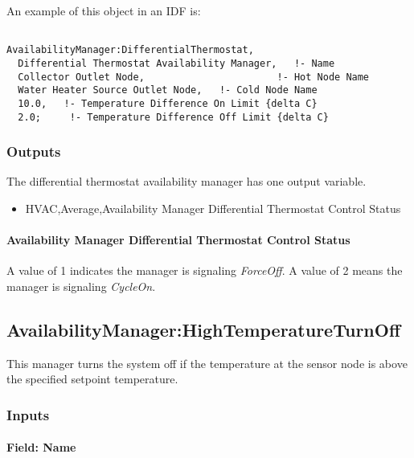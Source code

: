An example of this object in an IDF is:

\begin{lstlisting}

AvailabilityManager:DifferentialThermostat,
  Differential Thermostat Availability Manager,   !- Name
  Collector Outlet Node,                       !- Hot Node Name
  Water Heater Source Outlet Node,   !- Cold Node Name
  10.0,   !- Temperature Difference On Limit {delta C}
  2.0;     !- Temperature Difference Off Limit {delta C}
\end{lstlisting}

\subsubsection{Outputs}\label{outputs-3-020}

The differential thermostat availability manager has one output variable.

\begin{itemize}
\tightlist
\item
  HVAC,Average,Availability Manager Differential Thermostat Control Status
\end{itemize}

\paragraph{Availability Manager Differential Thermostat Control Status}\label{availability-manager-differential-thermostat-control-status}

A value of 1 indicates the manager is signaling \emph{ForceOff}. A value of 2 means the manager is signaling \emph{CycleOn}.

\subsection{AvailabilityManager:HighTemperatureTurnOff}\label{availabilitymanagerhightemperatureturnoff}

This manager turns the system off if the temperature at the sensor node is above the specified setpoint temperature.

\subsubsection{Inputs}\label{inputs-5-031}

\paragraph{Field: Name}\label{field-name-4-029}

